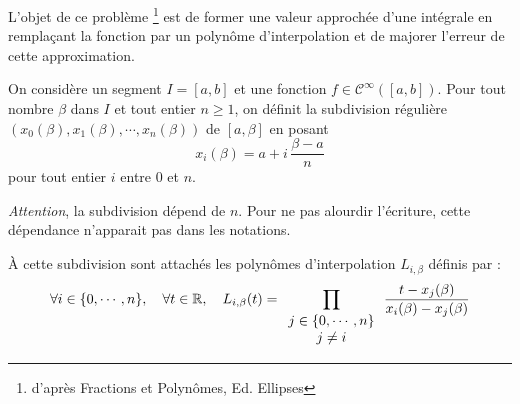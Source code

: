 L'objet de ce problème \footnote{d'après Fractions et Polynômes, Ed. Ellipses} est de former une valeur approchée d'une intégrale en remplaçant la fonction par un polynôme d'interpolation et de majorer l'erreur de cette approximation.

On considère un segment $I=[a,b]$ et une fonction $f\in\mathcal{C}^{\infty}([a,b])$.\newline
Pour tout nombre $\beta$ dans $I$ et tout entier $n\geq1$, on définit la subdivision régulière $(x_0(\beta),x_1(\beta), \cdots , x_n(\beta))$ de $[a,\beta]$ en posant
\[x_i(\beta)=a+i \,\frac{\beta - a}{n}\]
pour tout entier $i$ entre 0 et $n$.

\emph{Attention}, la subdivision dépend  de $n$. Pour ne pas alourdir l'écriture, cette dépendance n'apparait pas dans les notations.

{\`A} cette subdivision sont attachés les polynômes d'interpolation $L_{i,\beta}$ définis par :
\begin{displaymath}
\forall i \in \{0,\cdots, n\}, \quad \forall t\in \mathbb{R}, \quad L_{i,\beta}(t) = \prod _{
  \begin{array}{c}
  j\in \{0,\cdots ,n\}\\
  j\neq i
  \end{array}
}
\frac{t-x_j(\beta)}{x_i(\beta)-x_j(\beta)}
 \end{displaymath}

